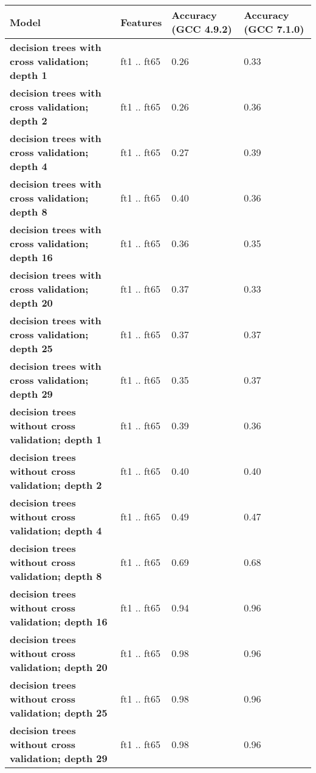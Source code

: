     \begin{tabular}{|l|p{1.2in}|p{0.9in}|p{0.9in}|}
     \hline
      \textbf{Model} & \textbf{Features} & \textbf{Accuracy (GCC 4.9.2)} & \textbf{Accuracy (GCC 7.1.0)} \\ 
     \hline
      \textbf{ decision trees with cross validation; depth 1 } &  ft1 .. ft65  &  0.26  &  0.33 \\
     \hline
      \textbf{ decision trees with cross validation; depth 2 } &  ft1 .. ft65  &  0.26  &  0.36 \\
     \hline
      \textbf{ decision trees with cross validation; depth 4 } &  ft1 .. ft65  &  0.27  &  0.39 \\
     \hline
      \textbf{ decision trees with cross validation; depth 8 } &  ft1 .. ft65  &  0.40  &  0.36 \\
     \hline
      \textbf{ decision trees with cross validation; depth 16 } &  ft1 .. ft65  &  0.36  &  0.35 \\
     \hline
      \textbf{ decision trees with cross validation; depth 20 } &  ft1 .. ft65  &  0.37  &  0.33 \\
     \hline
      \textbf{ decision trees with cross validation; depth 25 } &  ft1 .. ft65  &  0.37  &  0.37 \\
     \hline
      \textbf{ decision trees with cross validation; depth 29 } &  ft1 .. ft65  &  0.35  &  0.37 \\
     \hline
      \textbf{ decision trees without cross validation; depth 1 } &  ft1 .. ft65  &  0.39  &  0.36 \\
     \hline
      \textbf{ decision trees without cross validation; depth 2 } &  ft1 .. ft65  &  0.40  &  0.40 \\
     \hline
      \textbf{ decision trees without cross validation; depth 4 } &  ft1 .. ft65  &  0.49  &  0.47 \\
     \hline
      \textbf{ decision trees without cross validation; depth 8 } &  ft1 .. ft65  &  0.69  &  0.68 \\
     \hline
      \textbf{ decision trees without cross validation; depth 16 } &  ft1 .. ft65  &  0.94  &  0.96 \\
     \hline
      \textbf{ decision trees without cross validation; depth 20 } &  ft1 .. ft65  &  0.98  &  0.96 \\
     \hline
      \textbf{ decision trees without cross validation; depth 25 } &  ft1 .. ft65  &  0.98  &  0.96 \\
     \hline
      \textbf{ decision trees without cross validation; depth 29 } &  ft1 .. ft65  &  0.98  &  0.96 \\

\end{tabular}

